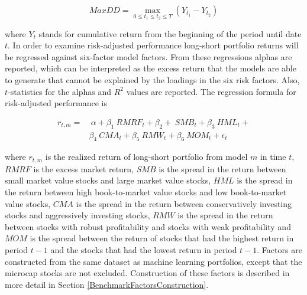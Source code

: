 \documentclass[12pt]{article}
\begin{document}
\begin{equation}
\label{eq:maxDD}
MaxDD = \max\limits_{0\leq t_1\leq t_2\leq T} (Y_{t_1} - Y_{t_2})
\end{equation}

where $Y_t$ stands for cumulative return from the beginning of the period until date $t$. In order to examine risk-adjusted performance long-short portfolio returns will be regressed against \citet{FAMA20151} six-factor model factors.\footnotemark {} From these regressions alphas are reported, which can be interpreted as the excess return that the models are able to generate that cannot be explained by the loadings in the six risk factors. Also, $t$-statistics for the alphas and $R^2$ values are reported. The regression formula for risk-adjusted performance is \par

\begin{equation}
\label{eq:FFRegFormula}
\begin{split}
r_{t, m} = 	& \ \alpha+ \beta_{1} \ RMRF_{t} + \beta_{2} + \ SMB_{t} + \beta_{3} \ HML_{t} + \\
		&  \beta_{4} \ CMA_{t} +  \beta_{5} \ RMW_{t} + \beta_{6} \ MOM_{t} + \epsilon_{t}
\end{split}
\end{equation}

where $r_{t, m}$ is the realized return of long-short portfolio from model $m$ in time $t$, $RMRF$ is the excess market return, $SMB$ is the spread in the return between small market value stocks and large market value stocks, $HML$ is the spread in the return between high book-to-market value stocks and low book-to-market value stocks, $CMA$ is the spread in the return between conservatively investing stocks and aggressively investing stocks, $RMW$ is the spread in the return between stocks with robust profitability and stocks with weak profitability and $MOM$ is the spread between the return of stocks that had the highest return in period $t-1$ and the stocks that had the lowest return in period $t-1$.\footnotemark {} Factors are constructed from the same dataset as machine learning portfolios, except that the microcap stocks are not excluded. Construction of these factors is described in more detail in Section \ref{BenchmarkFactorsConstruction}. \par
\end{document}
